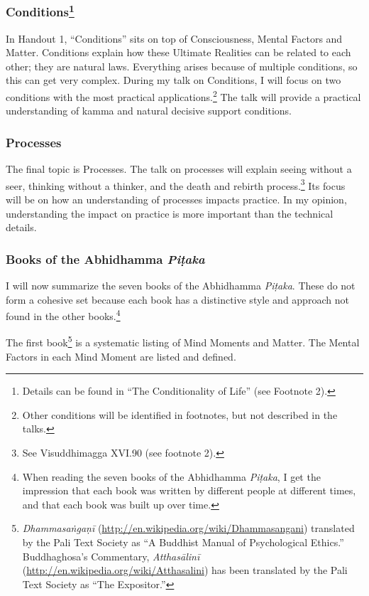 \subsubsection*{Conditions\footnote{Details can be found in “The Conditionality of Life” (see Footnote 2).}}

In Handout 1, “Conditions” sits on top of Consciousness, Mental Factors and Matter. Conditions explain how these Ultimate Realities can be related to each other; they are natural laws. Everything arises because of multiple conditions, so this can get very complex. During my talk on Conditions, I will focus on two conditions with the most practical applications.\footnote{Other conditions will be identified in footnotes, but not described in the talks.} The talk will provide a practical understanding of kamma and natural decisive support conditions. 

\subsubsection*{Processes}

The final topic is Processes. The talk on processes will explain seeing without a seer, thinking without a thinker, and the death and rebirth process.\footnote{See Visuddhimagga XVI.90 (see footnote 2).} Its focus will be on how an understanding of processes impacts practice. In my opinion, understanding the impact on practice is more important than the technical details.

\subsubsection*{Books of the Abhidhamma \textit{Piṭaka}}

I will now summarize the seven books of the Abhidhamma \textit{Piṭaka}. These do not form a cohesive set because each book has a distinctive style and approach not found in the other books.\footnote{When reading the seven books of the Abhidhamma \textit{Piṭaka}, I get the impression that each book was written by different people at different times, and that each book was built up over time.}

The first book\footnote{\textit{Dhammasaṅgaṇī} (\url{http://en.wikipedia.org/wiki/Dhammasangani}) translated by the Pali Text Society as “A Buddhist Manual of Psychological Ethics.” Buddhaghosa’s Commentary, \textit{Atthasālinī} (\url{http://en.wikipedia.org/wiki/Atthasalini}) has been translated by the Pali Text Society as “The Expositor.”} is a systematic listing of Mind Moments and Matter. The Mental Factors in each Mind Moment are listed and defined. 

